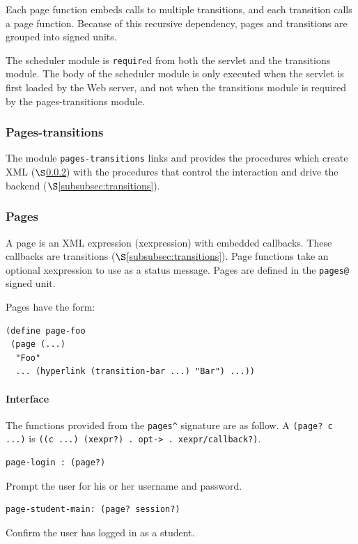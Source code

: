 \documentclass[a4paper]{article}
\begin{document}
Each page function embeds calls to multiple transitions, and each transition
calls a page function. Because of this recursive dependency, pages and 
transitions are grouped into signed units.

The scheduler module is \verb|requir|ed from both the servlet and the
transitions module. The body of the scheduler module is only executed when the
servlet is first loaded by the Web server, and not when the transitions module
is required by the pages-transitions module.

\subsubsection{Pages-transitions}\label{subsubsec:pages-transitions}

The module \verb|pages-transitions| links and provides the procedures which
create XML ($\S$\ref{subsubsec:pages}) with the procedures that control the
interaction and drive the backend ($\S$\ref{subsubsec:transitions}).

\subsubsection{Pages}\label{subsubsec:pages}

A page is an XML expression (xexpression) with embedded callbacks. These callbacks
are transitions ($\S$\ref{subsubsec:transitions}). Page functions take an
optional xexpression to use as a status message. Pages are defined in the
\verb|pages@| signed unit.

Pages have the form:

\begin{verbatim}
(define page-foo 
 (page (...)
  "Foo"
  ... (hyperlink (transition-bar ...) "Bar") ...))
\end{verbatim}

\paragraph{Interface}\label{para:pages-interface}

The functions provided from the \verb|pages^| signature are as follow. A
\verb|(page? c ...)| is \verb|((c ...) (xexpr?) . opt-> . xexpr/callback?)|.

\begin{verbatim}
page-login : (page?)
\end{verbatim}
Prompt the user for his or her username and password.

\begin{verbatim}
page-student-main: (page? session?)
\end{verbatim}
Confirm the user has logged in as a student.
\end{document}
